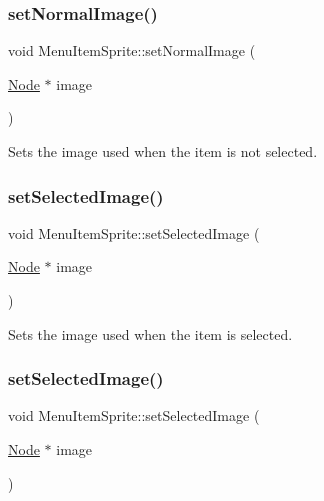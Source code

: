 \subsubsection{\texorpdfstring{set\+Normal\+Image()}{setNormalImage()}\hspace{0.1cm}{\footnotesize\ttfamily [2/2]}}
{\footnotesize\ttfamily void Menu\+Item\+Sprite\+::set\+Normal\+Image (\begin{DoxyParamCaption}\item[{\hyperlink{classNode}{Node} $\ast$}]{image }\end{DoxyParamCaption})}

Sets the image used when the item is not selected. \mbox{\label{classMenuItemSprite_adc05f4e00100f4d526786709b9294ad6}} 
\subsubsection{\texorpdfstring{set\+Selected\+Image()}{setSelectedImage()}\hspace{0.1cm}{\footnotesize\ttfamily [1/2]}}
{\footnotesize\ttfamily void Menu\+Item\+Sprite\+::set\+Selected\+Image (\begin{DoxyParamCaption}\item[{\hyperlink{classNode}{Node} $\ast$}]{image }\end{DoxyParamCaption})}

Sets the image used when the item is selected. \mbox{\label{classMenuItemSprite_adc05f4e00100f4d526786709b9294ad6}} 
\subsubsection{\texorpdfstring{set\+Selected\+Image()}{setSelectedImage()}\hspace{0.1cm}{\footnotesize\ttfamily [2/2]}}
{\footnotesize\ttfamily void Menu\+Item\+Sprite\+::set\+Selected\+Image (\begin{DoxyParamCaption}\item[{\hyperlink{classNode}{Node} $\ast$}]{image }\end{DoxyParamCaption})}

